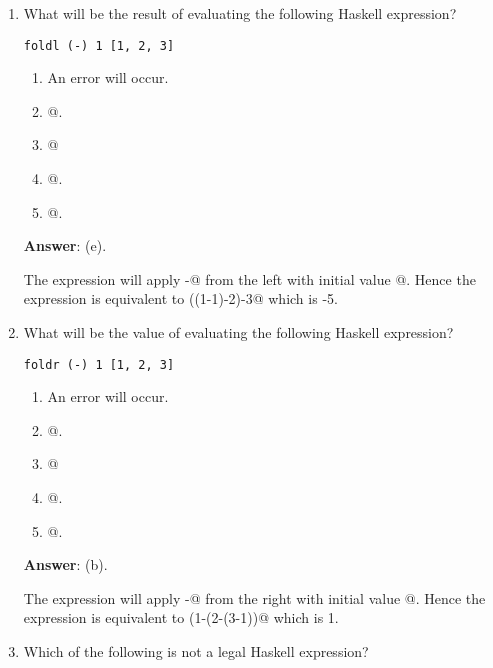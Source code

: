 \documentclass[12pt]{article}
\begin{document}
\begin{enumerate}
\item What will be the result of evaluating the following Haskell expression?

\begin{verbatim}
foldl (-) 1 [1, 2, 3]
\end{verbatim}

\begin{enumerate}
\item An error will occur.

\item {}@.

\item {}@
  
\item {}@.

\item {}@.

  
\end{enumerate}

\textbf{Answer}: (e).

The expression will apply \verb@-@ from the left with initial
value @.  Hence the expression is equivalent to
\verb@((1-1)-2)-3@ which is -5.


\item What will be the value of evaluating the following Haskell
  expression?

\begin{verbatim}
foldr (-) 1 [1, 2, 3]
\end{verbatim}

\begin{enumerate}

\item An error will occur.

\item {}@.

\item {}@
  
\item {}@.

\item {}@.

\end{enumerate}

\textbf{Answer}: (b).

The expression will apply \verb@-@ from the right with initial
value @.  Hence the expression is equivalent to
\verb@(1-(2-(3-1))@ which is 1.

\item Which of the following is not a legal Haskell expression?


\end{enumerate}
\end{document}
